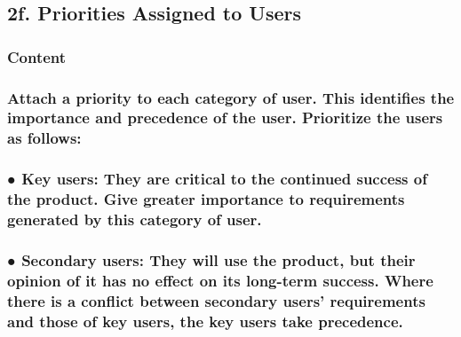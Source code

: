 \documentclass[
]{article}
\begin{document}
\hypertarget{f.-priorities-assigned-to-users}{%
\subsection{2f. Priorities Assigned to
Users}\label{f.-priorities-assigned-to-users}}

\hypertarget{content-7}{%
\subsubsection{Content}\label{content-7}}

\hypertarget{attach-a-priority-to-each-category-of-user.-this-identifies-the-importance-and-precedence-of-the-user.-prioritize-the-users-as-follows}{%
\subsubsection{Attach a priority to each category of user. This
identifies the importance and precedence of the user. Prioritize the
users as
follows:}\label{attach-a-priority-to-each-category-of-user.-this-identifies-the-importance-and-precedence-of-the-user.-prioritize-the-users-as-follows}}

\hypertarget{key-users-they-are-critical-to-the-continued-success-of-the-product.-give-greater-importance-to-requirements-generated-by-this-category-of-user.}{%
\subsubsection{\texorpdfstring{● Key users: They are critical to the
continued success of the product. Give greater importance to
requirements generated by this category of user.
}{● Key users: They are critical to the continued success of the product. Give greater importance to requirements generated by this category of user. }}\label{key-users-they-are-critical-to-the-continued-success-of-the-product.-give-greater-importance-to-requirements-generated-by-this-category-of-user.}}

\hypertarget{secondary-users-they-will-use-the-product-but-their-opinion-of-it-has-no-effect-on-its-long-term-success.-where-there-is-a-conflict-between-secondary-users-requirements-and-those-of-key-users-the-key-users-take-precedence.}{%
\subsubsection{● Secondary users: They will use the product, but their
opinion of it has no effect on its long-term success. Where there is a
conflict between secondary users' requirements and those of key users,
the key users take
precedence.}\label{secondary-users-they-will-use-the-product-but-their-opinion-of-it-has-no-effect-on-its-long-term-success.-where-there-is-a-conflict-between-secondary-users-requirements-and-those-of-key-users-the-key-users-take-precedence.}}
\end{document}
